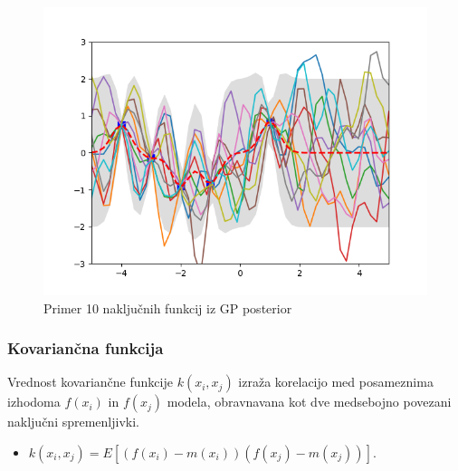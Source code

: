 \documentclass{beamer}
\begin{document}
\begin{frame}
\begin{figure}[h]
\caption{Primer 10 naključnih funkcij iz GP posterior}
\centering
\includegraphics[width=1\textwidth]{10posterior}
\end{figure}

\end{frame}


\begin{frame}

\frametitle{Kovariančna funkcija}

Vrednost kovariančne funkcije $k(x_i, x_j)$ izraža korelacijo med posameznima izhodoma $f(x_i)$ in $f(x_j)$ modela, obravnavana kot dve medsebojno povezani naključni spremenljivki. 
\begin{itemize}
\item $ k(x_i, x_j) = E[ (f(x_i) - m(x_i)) (f(x_j)-m(x_j)) ] $.
\end{itemize}




\end{frame}

\end{document}
